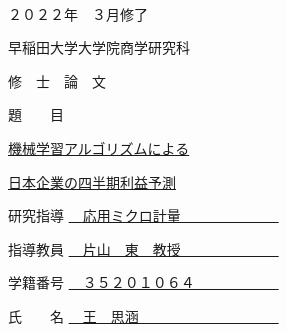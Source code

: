 \begin{titlepage}
    \begin{center}
        
        {\tiny 　}
        \vspace{20truept}

        {\large ２０２２年　３月修了}

        \vspace{10truept}

        {\Large 早稲田大学大学院商学研究科}

        \vspace{30truept}
    
        {\Huge 修　士　論　文}
    
    
        \vspace{30truept}
        
        {\large 題　　目　　　　　　　　　　　　　　}
        
        \vspace{20truept}
  
  
        {\large 
        \underline{機械学習アルゴリズムによる}
        }

        \vspace{10truept}

        {\large
        \underline{日本企業の四半期利益予測}
        }

        \vspace{180truept}

        {\large 研究指導 
        \underline{　応用ミクロ計量　　　　　　　}
        }

        \vspace{10truept}

        {\large 指導教員 
        \underline{　片山　東　教授　　　　　　　}
        }

        \vspace{10truept}

        {\large 学籍番号 
        \underline{　３５２０１０６４　　　　　　}
        }

        \vspace{10truept}

        {\large 氏　　名 
        \underline{　王　思涵　　　　　　　　　　}
        }
  
    \end{center}
  \end{titlepage}